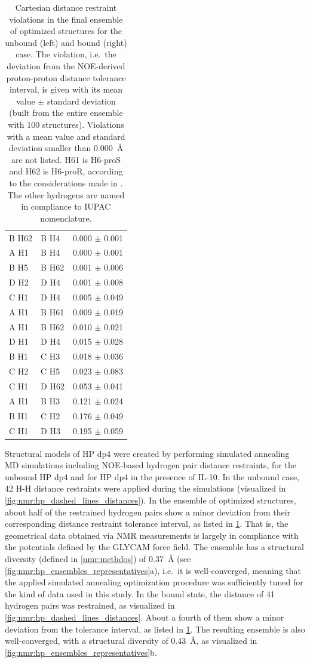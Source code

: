 \begin{table}
\begin{tabular}{llc}
B H62 & B H4 & 0.000 $\pm$ 0.001 \\
A H1 & B H4 & 0.000 $\pm$ 0.001 \\
B H5 & B H62 & 0.001 $\pm$ 0.006 \\
D H2 & D H4 & 0.001 $\pm$ 0.008 \\
C H1 & D H4 & 0.005 $\pm$ 0.049 \\
A H1 & B H61 & 0.009 $\pm$ 0.019 \\
A H1 & B H62 & 0.010 $\pm$ 0.021 \\
D H1 & D H4 & 0.015 $\pm$ 0.028 \\
B H1 & C H3 & 0.018 $\pm$ 0.036 \\
C H2 & C H5 & 0.023 $\pm$ 0.083 \\
C H1 & D H62 & 0.053 $\pm$ 0.041 \\
A H1 & B H3 & 0.121 $\pm$ 0.024 \\
B H1 & C H2 & 0.176 $\pm$ 0.049 \\
C H1 & D H3 & 0.195 $\pm$ 0.059 \\
\midrule
\end{tabular}
\caption{
Cartesian distance restraint violations in the final ensemble of optimized
structures for the unbound (left) and bound (right) case. The violation, i.e.\
the deviation from the NOE-derived proton-proton distance tolerance interval, is
given with its mean value $\pm$ standard deviation (built from the entire
ensemble with 100 structures). Violations with a mean value and standard
deviation smaller than \SI{0.000}{\angstrom} are not listed. H61 is H6-proS and
H62 is H6-proR, according to the considerations made in
\cite{nishida_rotameric_nmr_1988}. The other hydrogens are named in compliance
to IUPAC nomenclature.}
\label{tab:nmr:restraint_viols_free}
\end{table}


Structural models of HP dp4 were created by performing simulated annealing MD
simulations including NOE-based hydrogen pair distance restraints, for the
unbound HP dp4 and for HP dp4 in the presence of IL-10. In the unbound case, 42
H-H distance restraints were applied during the simulations (visualized in
\cref{fig:nmr:hp_dashed_lines_distances}). In the ensemble of optimized
structures, about half of the restrained hydrogen pairs show a minor deviation
from their corresponding distance restraint tolerance interval, as listed in
\cref{tab:nmr:restraint_viols_free}. That is, the geometrical data obtained via
NMR measurements is largely in compliance with the potentials defined by the
GLYCAM force field. The ensemble has a structural diversity (defined in
\cref{nmr:methdos}) of \SI{0.37}{\angstrom}
(see \cref{fig:nmr:hp_ensembles_representatives}a), i.e.\ it is well-converged,
meaning that the applied simulated annealing optimization procedure was
sufficiently tuned for the kind of data used in this study. In the bound state,
the distance of 41 hydrogen pairs was restrained, as visualized in
\cref{fig:nmr:hp_dashed_lines_distances}. About a fourth of them show a minor
deviation from the tolerance interval, as listed in
\cref{tab:nmr:restraint_viols_free}. The resulting ensemble is also
well-converged, with a structural diversity of \SI{0.43}{\angstrom}, as
visualized in \cref{fig:nmr:hp_ensembles_representatives}b.

